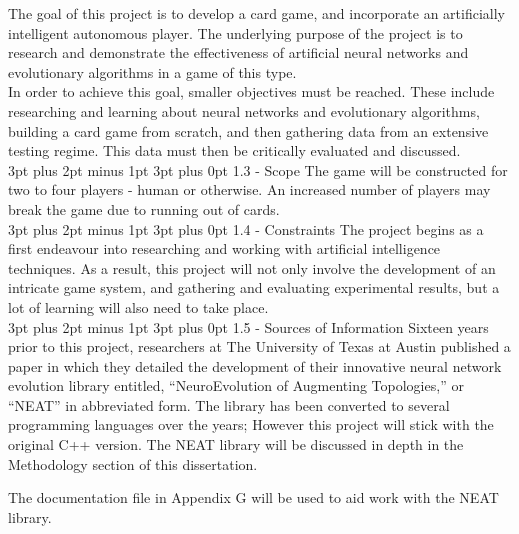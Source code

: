 \documentclass[12pt,a4paper]{article}
\makeatletter
\renewcommand\subsection{\@startsection {subsection}{1}{2mm} %
                               {3pt plus 2pt minus 1pt} %
                               {3pt plus 0pt} %
                               {\normalfont\bfseries}}
\makeatother
\begin{document}
The goal of this project is to develop a card game, and incorporate an artificially intelligent autonomous player. The underlying purpose of the project is to research and demonstrate the effectiveness of artificial neural networks and evolutionary algorithms in a game of this type.  \\

In order to achieve this goal, smaller objectives must be reached. These include researching and learning about neural networks and evolutionary algorithms, building a card game from scratch, and then gathering data from an extensive testing regime. This data must then be critically evaluated and discussed. \\

\subsection{1.3 - Scope}
The game will be constructed for two to four players - human or otherwise. An increased number of players may break the game due to running out of cards. \\

\subsection{1.4 - Constraints}
The project begins as a first endeavour into researching and working with artificial intelligence techniques. As a result, this project will not only involve the development of an intricate game system, and gathering and evaluating experimental results, but a lot of learning will also need to take place. \\

\subsection{1.5 - Sources of Information} 
Sixteen years prior to this project, researchers at The University of Texas at Austin published a paper in which they detailed the development of their innovative neural network evolution library\citep{NEAT} entitled, \enquote{NeuroEvolution of Augmenting Topologies,} or \enquote{NEAT} in abbreviated form. The library has been converted to several programming languages over the years; However this project will stick with the original C++ version. The NEAT library will be discussed in depth in the Methodology section of this dissertation.

The documentation file in Appendix G will be used to aid work with the NEAT library.\\
\end{document}
